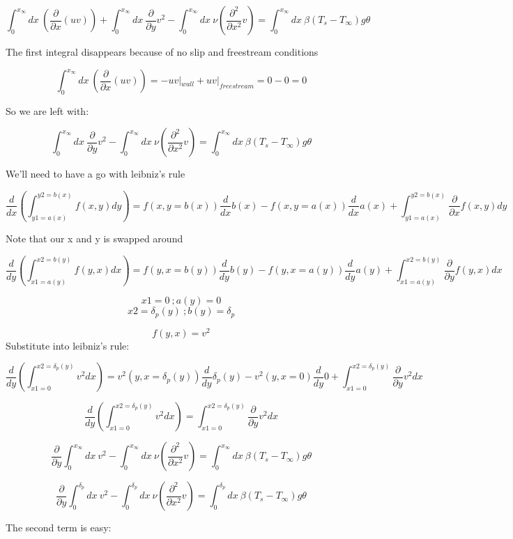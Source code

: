 \documentclass[11pt]{article}
\begin{document}
$$ \int_0^{x_\infty}  dx\ (\frac{\partial }{\partial x} (uv) )  + \int_0^{x_\infty}  dx \  \frac{\partial}{\partial y} v^2  - \int_0^{x_\infty}  dx \ \nu ( \frac{\partial^2}{\partial x^2} v ) =  \int_0^{x_\infty}  dx \ \beta(T_s-T_\infty) g \theta $$

The first integral disappears because of no slip and freestream conditions

$$ \int_0^{x_\infty}  dx\ (\frac{\partial }{\partial x} (uv) ) = - uv|_{wall} + uv|_{freestream} = 0 - 0 = 0$$

So we are left with:

$$ \int_0^{x_\infty}  dx \  \frac{\partial}{\partial y} v^2  - \int_0^{x_\infty}  dx \ \nu ( \frac{\partial^2}{\partial x^2} v ) =  \int_0^{x_\infty}  dx \ \beta(T_s-T_\infty) g \theta $$

We'll need to have a go with leibniz's rule

$$\frac{d}{dx} \left( \int_{y1=a(x)}^{y2=b(x)} f(x,y) dy \right)= f(x,y=b(x)) \frac{d}{dx}b(x) - f(x,y=a(x)) \frac{d}{dx} a(x)  +  \int_{y1=a(x)}^{y2=b(x)} \frac{\partial}{\partial x} f(x,y) dy $$

Note that our x and y is swapped around

$$ \frac{d}{dy} \left( \int_{x1=a(y)}^{x2=b(y)} f(y,x) dx \right)= f(y,x=b(y)) \frac{d}{dy}b(y) - f(y,x=a(y)) \frac{d}{dy} a(y)  +  \int_{x1=a(y)}^{x2=b(y)} \frac{\partial}{\partial y} f(y,x) dx $$

$$x1=0 \ ; a(y) = 0$$
$$x2= \delta_p (y) \ ; b(y) = \delta_p$$

$$f(y,x) = v^2$$
Substitute into leibniz's rule:

$$ \frac{d}{dy} \left( \int_{x1=0}^{x2=\delta_p(y)} v^2 dx \right)= v^2 (y,x=\delta_p(y)) \frac{d}{dy}\delta_p(y) - v^2 (y,x=0) \frac{d}{dy} 0  +  \int_{x1=0}^{x2=\delta_p(y)} \frac{\partial}{\partial y} v^2 dx $$

$$ \frac{d}{dy} \left( \int_{x1=0}^{x2=\delta_p(y)} v^2 dx \right)=   \int_{x1=0}^{x2=\delta_p(y)} \frac{\partial}{\partial y} v^2 dx $$


$$ \frac{\partial}{\partial y} \int_0^{x_\infty}  dx \   v^2  - \int_0^{x_\infty}  dx \ \nu ( \frac{\partial^2}{\partial x^2} v ) =  \int_0^{x_\infty}  dx \ \beta(T_s-T_\infty) g \theta $$

$$ \frac{\partial}{\partial y} \int_0^{\delta_p}  dx \   v^2  - \int_0^{\delta_p}  dx \ \nu ( \frac{\partial^2}{\partial x^2} v ) =  \int_0^{\delta_p}  dx \ \beta(T_s-T_\infty) g \theta $$


The second term is easy:
\end{document}
